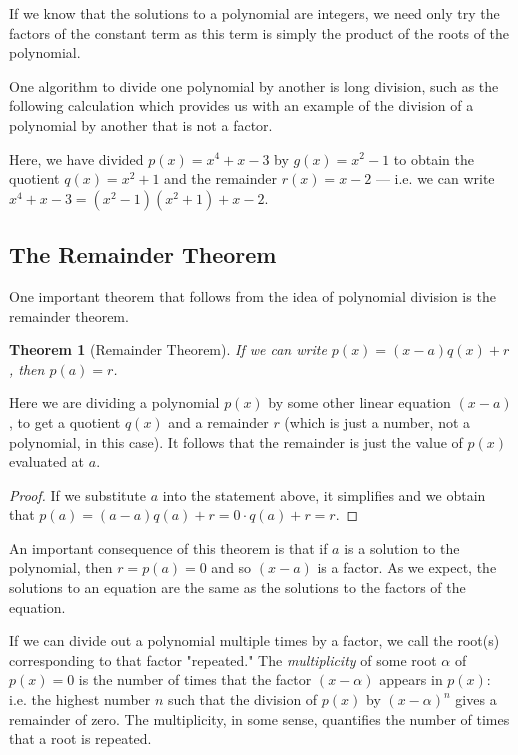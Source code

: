 \documentclass[a4paper,10pt,titlepage]{article}
\newtheorem*{thm}{Theorem}
\theoremstyle{definition}
\begin{document}
If we know that the solutions to a polynomial are integers, we need only try the factors
of the constant term as this term is simply the product of the roots of the polynomial.

One algorithm to divide one polynomial by another is long division, such as the following
calculation which provides us with an example of the division of a polynomial by another that is not a factor.

\begin{center}
\end{center}

Here, we have divided $ p(x) = x^4 + x - 3 $ by $ g(x) = x^2 - 1 $ to obtain the quotient $ q(x) = x^2 + 1 $
and the remainder $ r(x) = x - 2 $ --- i.e. we can write $ x^4 + x - 3 = (x^2 - 1)(x^2 + 1) + x - 2 $.

\subsection*{The Remainder Theorem}
One important theorem that follows from the idea of polynomial division is the remainder theorem.

\begin{thm}[Remainder Theorem]
  If we can write $ p(x) = (x-a) q(x) + r $, then $ p(a) = r $.
\end{thm}

Here we are dividing a polynomial $ p(x) $ by some other
linear equation $ (x-a) $, to get a quotient $ q(x) $ and a remainder $ r $
(which is just a number, not a polynomial, in this case). It follows that the
remainder is just the value of $ p(x) $ evaluated at $ a $.

\begin{proof}
  If we substitute $ a $ into the statement above, it simplifies and we obtain that
  $ p(a) = (a - a)q(a) + r = 0\cdot q(a) + r = r $.
\end{proof}

An important consequence of this theorem is that if $ a $ is a solution to the
polynomial, then $ r = p(a) = 0 $ and so $ (x - a) $ is a factor. As we expect,
the solutions to an equation are the same as the solutions to the factors of the equation.

If we can divide out a polynomial multiple times by a factor, we call the
root(s) corresponding to that factor "repeated." The \textit{multiplicity}
of some root $ \alpha $ of $ p(x) = 0 $ is the number of times that the factor
$ (x - \alpha) $ appears in $ p(x) $: i.e. the highest number $ n $ such that the division
of $ p(x) $ by $ (x - \alpha)^n $ gives a remainder of zero. The multiplicity, in some
sense, quantifies the number of times that a root is repeated.
\end{document}
